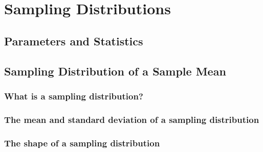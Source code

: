 \chapter{Sampling Distributions}  %

\section{Parameters and Statistics}  %

\section{Sampling Distribution of a Sample Mean}  %
    \subsection{What is a sampling distribution?}  %
    \subsection{The mean and standard deviation of a sampling distribution}  %
    \subsection{The shape of a sampling distribution}  %
    